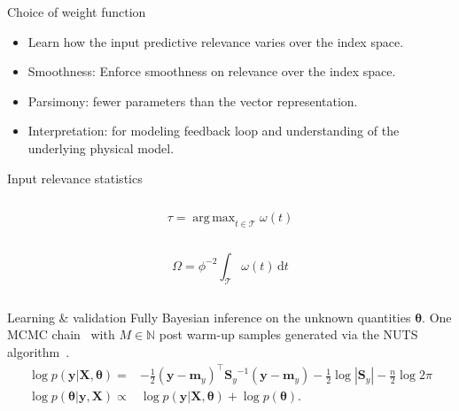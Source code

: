 \documentclass[final]{beamer}
\newlength{\colwidth}
\DeclareMathOperator*{\argmax}{arg\,max}
\begin{document}
\begin{frame}[t]
\begin{columns}[t]
\begin{column}{\colwidth}
    \begin{block}{Choice of weight function}
      \begin{itemize}
      \item Learn how the input predictive relevance varies over the index
        space.
      \item Smoothness: Enforce smoothness on relevance over the index space.
      \item Parsimony: fewer parameters than the vector representation.
      \item Interpretation: for modeling feedback loop and understanding of the
        underlying physical model.
      \end{itemize}
    \end{block}

    \begin{block}{Input relevance statistics}
      \begin{column}{.4\linewidth}
        \begin{equation}
          \tau=\argmax_{t\in\mathcal{T}}\omega(t)
        \end{equation}
      \end{column}
      \begin{column}{.4\linewidth}
        \begin{equation}
          \Omega=\phi^{-2}\int_\mathcal{T}\omega(t)\,\mathrm{d}t
        \end{equation}
      \end{column}
    \end{block}

    \begin{block}{Learning \& validation}
      Fully Bayesian inference on the unknown quantities $\bm{\theta}$.
      One MCMC chain~\citep{raftery1992} with $M \in \mathbb{N}$ post warm-up
      samples generated via the NUTS algorithm~\citep{hoffman2014}.
      \begin{align}
        \label{eq:margina-likelihood}
        \log p(\mathbf{y} | \mathbf{X}, \bm{\theta})
        =& -\frac{1}{2}
           {(\mathbf{y} - \mathbf{m}_y)}^\top
           {\mathbf{S}_y}^{-1}
           {(\mathbf{y} - \mathbf{m}_y)}
           -\frac{1}{2}
           \log | \mathbf{S}_y |
           - \frac{n}{2} \log 2\pi \\
        \label{eq:parameter-posterior}
        \log p(\bm{\theta} | \mathbf{y}, \mathbf{X})
        \propto&
                 \log p(\mathbf{y} | \mathbf{X}, \bm{\theta}) +
                 \log p(\bm{\theta}).
      \end{align}


\end{block}
\end{column}
\end{columns}
\end{frame}
\end{document}
